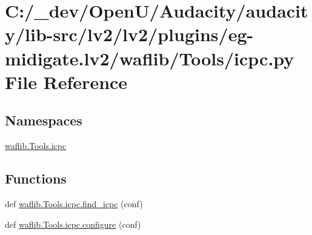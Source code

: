 \hypertarget{lv2_2plugins_2eg-midigate_8lv2_2waflib_2_tools_2icpc_8py}{}\section{C\+:/\+\_\+dev/\+Open\+U/\+Audacity/audacity/lib-\/src/lv2/lv2/plugins/eg-\/midigate.lv2/waflib/\+Tools/icpc.py File Reference}
\label{lv2_2plugins_2eg-midigate_8lv2_2waflib_2_tools_2icpc_8py}
\subsection*{Namespaces}
\begin{DoxyCompactItemize}
\item 
 \hyperlink{namespacewaflib_1_1_tools_1_1icpc}{waflib.\+Tools.\+icpc}
\end{DoxyCompactItemize}
\subsection*{Functions}
\begin{DoxyCompactItemize}
\item 
def \hyperlink{namespacewaflib_1_1_tools_1_1icpc_a3f1e8dd3ca1313cf570316c73027db11}{waflib.\+Tools.\+icpc.\+find\+\_\+icpc} (conf)
\item 
def \hyperlink{namespacewaflib_1_1_tools_1_1icpc_ac5e97f409d9392b945bef908e0e7f9cd}{waflib.\+Tools.\+icpc.\+configure} (conf)
\end{DoxyCompactItemize}
